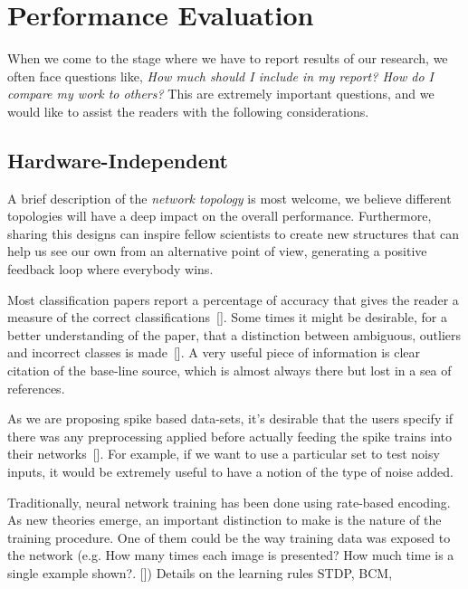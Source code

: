 \section{Performance Evaluation}
\label{sec:eval}

When we come to the stage where we have to report results of our research, we often face questions like, \emph{How much should I include in my report? How do I compare my work to others?} This are extremely important questions, and we would like to assist the readers with the following considerations.

\subsection{Hardware-Independent}
A brief description of the \emph{network topology} is most welcome, we believe different topologies will have a deep impact on the overall performance. Furthermore, sharing this designs can inspire fellow scientists to create new structures that can help us see our own from an alternative point of view, generating a positive feedback loop where everybody wins.

Most classification papers report a percentage of accuracy that gives the reader a measure of the correct classifications~[\cite{dietterich1998approximate}]. Some times it might be desirable, for a better understanding of the paper, that a distinction between ambiguous, outliers and incorrect classes is made~[\cite{liu2002performance}]. A very useful piece of information is clear citation of the base-line source, which is almost always there but lost in a sea of references.


As we are proposing spike based data-sets, it's desirable that the users specify if there was any preprocessing applied before actually feeding the spike trains into their networks~[\cite{best-practice-nn-img}]. For example, if we want to use a particular set to test noisy inputs, it would be extremely useful to have a notion of the type of noise added.

Traditionally, neural network training has been done using rate-based encoding. As new theories emerge, an important distinction to make is the nature of the  training procedure. One of them could be the way training data was exposed to the network (e.g. How many times each image is presented? How much time is a single example shown?. [\cite{unsup_leraning_diehl}]) Details on the learning rules STDP, BCM, 

